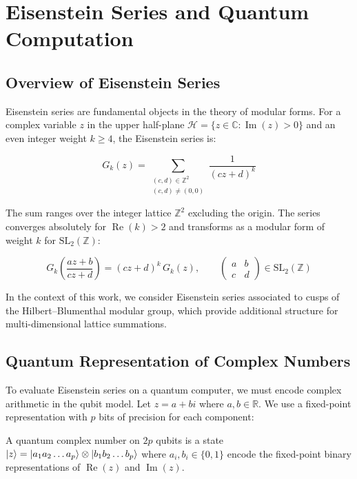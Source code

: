 \section{Eisenstein Series and Quantum Computation}


\subsection{Overview of Eisenstein Series}

Eisenstein series are fundamental objects in the theory of modular
forms. For a complex variable $z$ in the upper half-plane
$\mathcal{H} = \{z \in \mathbb{C} : \operatorname{Im}(z) > 0\}$
and an even integer weight $k \geq 4$, the Eisenstein series is:

\begin{equation}\label{eq:eisenstein}
G_k(z) = \sum_{\substack{(c,d) \in \mathbb{Z}^2 \\ (c,d) \neq (0,0)}}
\frac{1}{(cz + d)^k}
\end{equation}

The sum ranges over the integer lattice $\mathbb{Z}^2$ excluding the
origin. The series converges absolutely for $\operatorname{Re}(k) > 2$
and transforms as a modular form of weight $k$ for
$\mathrm{SL}_2(\mathbb{Z})$:

\[
G_k\!\left(\frac{az+b}{cz+d}\right) = (cz+d)^k \, G_k(z),
\qquad
\begin{pmatrix} a & b \\ c & d \end{pmatrix} \in \mathrm{SL}_2(\mathbb{Z})
\]

In the context of this work, we consider Eisenstein series associated
to cusps of the Hilbert--Blumenthal modular group, which provide
additional structure for multi-dimensional lattice summations.

\subsection{Quantum Representation of Complex Numbers}\label{sec:qrep}

To evaluate Eisenstein series on a quantum computer, we must encode
complex arithmetic in the qubit model. Let $z = a + bi$ where
$a, b \in \mathbb{R}$. We use a fixed-point representation with
$p$ bits of precision for each component:

\begin{definition}
A quantum complex number on $2p$ qubits is a state
$\ket{z} = \ket{a_1 a_2 \ldots a_p} \otimes \ket{b_1 b_2 \ldots b_p}$
where $a_i, b_i \in \{0,1\}$ encode the fixed-point binary
representations of $\operatorname{Re}(z)$ and $\operatorname{Im}(z)$.
\end{definition}

